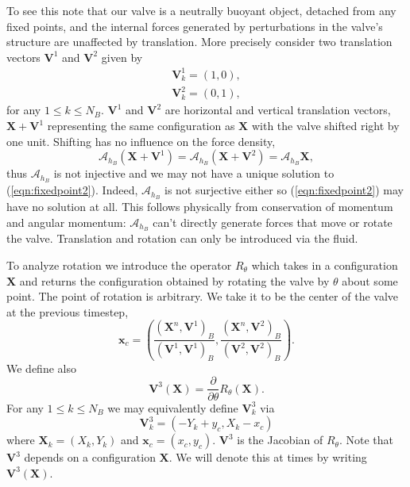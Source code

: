 \documentclass[preprint,12pt]{elsarticle}
\begin{document}
To see this note that our valve is a neutrally buoyant object, detached from any fixed points, and the internal forces generated by perturbations in the valve's structure are unaffected by translation. More precisely consider two translation vectors $\mathbf{V}^1$ and $\mathbf{V}^2$ given by
\begin{gather}
\mathbf{V}^1_k = (1,0),\\
\mathbf{V}^2_k = (0,1),
\end{gather}
for any $1\leq k\leq N_B$. $\mathbf{V}^1$ and $\mathbf{V}^2$ are horizontal and vertical translation vectors, $\mathbf{X}+\mathbf{V}^1$ representing the same configuration as $\mathbf{X}$ with the valve shifted right by one unit. Shifting has no influence on the force density,
\begin{equation}
\mathcal{A}_{h_B}(\mathbf{X}+\mathbf{V}^1) = \mathcal{A}_{h_B}(\mathbf{X}+\mathbf{V}^2) = \mathcal{A}_{h_B}\mathbf{X},
\end{equation}
thus $\mathcal{A}_{h_B}$ is not injective and we may not have a unique solution to (\ref{eqn:fixedpoint2}). Indeed, $\mathcal{A}_{h_B}$ is not surjective either so (\ref{eqn:fixedpoint2}) may have no solution at all. This follows physically from conservation of momentum and angular momentum: $\mathcal{A}_{h_B}$ can't directly generate forces that move or rotate the valve. Translation and rotation can only be introduced via the fluid. 

To analyze rotation we introduce the operator $R_{\theta}$ which takes in a configuration $\mathbf{X}$ and returns the configuration obtained by rotating the valve by $\theta$ about some point. The point of rotation is arbitrary. We take it to be the center of the valve at the previous timestep,
\begin{equation}
\mathbf{x}_c = 
\left(\frac{( \mathbf{X}^n, \mathbf{V}^1)_B}{( \mathbf{V}^1, \mathbf{V}^1)_B}, 
\frac{( \mathbf{X}^n, \mathbf{V}^2)_B}{( \mathbf{V}^2, \mathbf{V}^2)_B}\right).
\label{eqn:Center}
\end{equation}
We define also
\begin{equation}
\mathbf{V}^3(\mathbf{X}) = \frac{\partial}{\partial \theta}R_\theta(\mathbf{X}). 
\label{eqn:e3}
\end{equation}
For any $1\leq k\leq N_B$ we may equivalently define $\mathbf{V}^3_k$ via
\begin{equation}
\mathbf{V}^3_k = (-Y_k+y_c,X_k-x_c)
\end{equation}
where $\mathbf{X}_k=(X_k,Y_k)$ and $\mathbf{x}_c = (x_c,y_c)$. $\mathbf{V}^3$ is the Jacobian of $R_\theta$. Note that $\mathbf{V}^3$ depends on a configuration $\mathbf{X}$. We will denote this at times by writing $\mathbf{V}^3(\mathbf{X})$.
\end{document}
